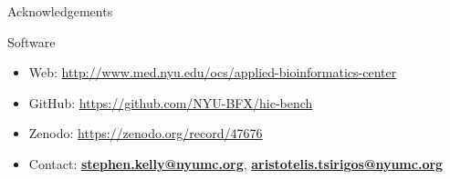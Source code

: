 \documentclass[final]{beamer}
\newlength{\onecolwid}
\begin{document}
\begin{frame}[t]
\begin{columns}[t]
\begin{column}{\onecolwid}
\begin{beamerboxesrounded}{Acknowledgements}
\end{beamerboxesrounded}\hfill
\begin{beamerboxesrounded}{Software}
\begin{itemize}
\item \footnotesize{Web: \href{http://www.med.nyu.edu/ocs/applied-bioinformatics-center}{http://www.med.nyu.edu/ocs/applied-bioinformatics-center}}
\item \footnotesize{GitHub: \href{https://github.com/NYU-BFX/hic-bench}{https://github.com/NYU-BFX/hic-bench}}
\item \footnotesize{Zenodo: \href{https://zenodo.org/record/47676}{https://zenodo.org/record/47676}}
\item \footnotesize{Contact: \href{mailto:stephen.kelly@nyumc.org}{\textbf{stephen.kelly@nyumc.org}}, \href{mailto:aristotelis.tsirigos@nyumc.org}{\textbf{aristotelis.tsirigos@nyumc.org}}}
\end{itemize}

\end{beamerboxesrounded}\hfill

\end{column} %

\end{columns} %

\end{frame} %
\end{document}
